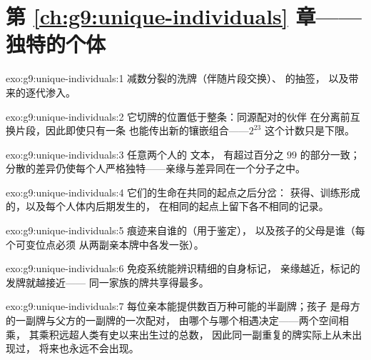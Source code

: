 \section*{第 \ref{ch:g9:unique-individuals} 章——独特的个体}

\begin{solution}{exo:g9:unique-individuals:1}
减数分裂的洗牌（伴随片段交换）、
的抽签，
以及带来的逐代渗入。
\end{solution}

\begin{solution}{exo:g9:unique-individuals:2}
它切牌的位置低于整条：同源配对的伙伴
在分离前互换片段，因此即使只有一条
也能传出新的镶嵌组合——$2^{23}$ 这个计数只是下限。
\end{solution}

\begin{solution}{exo:g9:unique-individuals:3}
任意两个人的  文本，
有超过百分之 $99$ 的部分一致；
分散的差异仍使每个人严格独特——亲缘与差异同在一个分子之中。
\end{solution}

\begin{solution}{exo:g9:unique-individuals:4}
它们的生命在共同的起点之后分岔：
获得、训练形成的，以及每个人体内后期发生的，
在相同的起点上留下各不相同的记录。
\end{solution}

\begin{solution}{exo:g9:unique-individuals:5}
痕迹来自谁的（用于鉴定），
以及孩子的父母是谁（每个可变位点必须
从两副亲本牌中各发一张）。
\end{solution}

\begin{solution}{exo:g9:unique-individuals:6}
免疫系统能辨识精细的自身标记，
亲缘越近，标记的发牌就越接近——
同一家族的牌共享得最多。
\end{solution}

\begin{solution}{exo:g9:unique-individuals:7}
每位亲本能提供数百万种可能的半副牌；孩子
是母方的一副牌与父方的一副牌的一次配对，
由哪个与哪个相遇决定——两个空间相乘，
其乘积远超人类有史以来出生过的总数，
因此同一副重复的牌实际上从未出现过，
将来也永远不会出现。
\end{solution}

